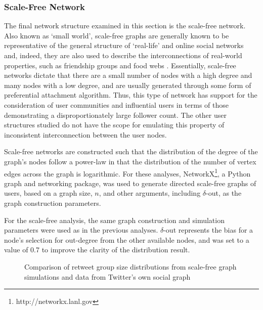 \subsubsection{Scale-Free Network}
The final network structure examined in this section is the scale-free network. Also known as `small world', scale-free graphs are generally known to be representative of the general structure of `real-life' and online social networks \cite{mislove07} and, indeed, they are also used to describe the interconnections of real-world properties, such as friendship groups and food webs \cite{guido07, hein06}. Essentially, scale-free networks dictate that there are a small number of nodes with a high degree and many nodes with a low degree, and are usually generated through some form of preferential attachment algorithm. Thus, this type of network has support for the consideration of user communities and influential users in terms of those demonstrating a disproportionately large follower count. The other user structures studied do not have the scope for emulating this property of inconsistent interconnection between the user nodes.

Scale-free networks are constructed such that the distribution of the degree of the graph's nodes follow a power-law in that the distribution of the number of vertex edges across the graph is logarithmic. For these analyses, NetworkX\footnote{http://networkx.lanl.gov}, a Python graph and networking package, was used to generate directed scale-free graphs of users, based on a graph size, $n$, and other arguments, including $\delta$-out, as the graph construction parameters. 

For the scale-free analysis, the same graph construction and simulation parameters were used as in the previous analyses. $\delta$-out represents the bias for a node's selection for out-degree from the other available nodes, and was set to a value of 0.7 to improve the clarity of the distribution result.

\begin{figure}[h]
\centering
{}
\caption{Comparison of retweet group size distributions from scale-free graph simulations and data from Twitter's own social graph}
\label{fig:real-scalefree}
\end{figure}

